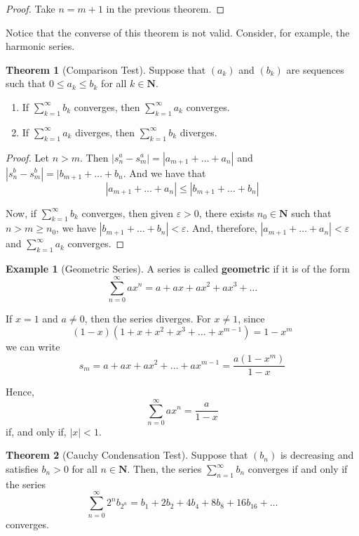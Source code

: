 \documentclass[12pt,a4paper]{article}
\theoremstyle{definition}
\newtheorem{theorem}{Theorem}[section]
\newtheorem{example}{Example}[section]
\begin{document}
\begin{proof}
	Take $n = m+1$ in the previous theorem.
\end{proof}

Notice that the converse of this theorem is not valid. Consider, for example, the harmonic series. 

\begin{theorem}[Comparison Test]
	Suppose that $(a_k)$ and $(b_k)$ are sequences such that $0 \leq a_k \leq b_k$ for all $k \in \textbf{N}$.
	\begin{enumerate}
		\item If $\sum_{k=1}^\infty b_k$ converges, then $\sum_{k=1}^\infty a_k$ converges.
		\item If $\sum_{k=1}^\infty a_k$ diverges, then $\sum_{k=1}^\infty b_k$ diverges.
	\end{enumerate}
\end{theorem}

\begin{proof}
	Let $n > m$. Then $|s_n^a - s_m^a| = |a_{m+1} + \ldots + a_n|$ and $|s_n^b - s_m^b| = |b_{m+1} + \ldots + b_n$. And we have that \[ |a_{m+1} + \ldots + a_n | \leq |b_{m+1} + \ldots + b_n| \]
	
	Now, if $\sum_{k=1}^\infty b_k$ converges, then given $\varepsilon > 0$, there exists $n_0 \in \textbf{N}$ such that $n > m \geq n_0$, we have $|b_{m+1} + \ldots + b_n| < \varepsilon$. And, therefore, $|a_{m+1} + \ldots + a_n| < \varepsilon$ and $\sum_{k=1}^\infty a_k$ converges.
\end{proof}

\begin{example}[Geometric Series]
	A series is called \textbf{geometric} if it is of the form
	\[
		\sum_{n=0}^\infty ax^n = a + ax + ax^2 + ax^3 + \ldots
	\]
	
	If $x = 1$ and $a \neq 0$, then the series diverges. For $x \neq 1$, since
	\[
		(1-x)(1+x+x^2+x^3+\ldots+x^{m-1}) = 1 - x^m 
	\]
	we can write
	\[
		s_m = a + ax + ax^2 + \ldots + ax^{m-1} = \frac{a(1-x^m)}{1-x}
	\]
	
	Hence, 
	\[
		\sum_{n=0}^\infty ax^n = \frac{a}{1-x}
	\]
	if, and only if, $|x| < 1$.
\end{example}

\begin{theorem}[Cauchy Condensation Test]
	Suppose that $(b_n)$ is decreasing and satisfies $b_n > 0$ for all $n \in \textbf{N}$. Then, the series $\sum_{n=1}^\infty b_n$ converges if and only if the series
	\[
		\sum_{n=0}^\infty 2^n b_{2^n} = b_1 + 2b_2 + 4b_4 + 8b_8 + 16b_16 + \ldots
	\]
	converges.
\end{theorem}
\end{document}
